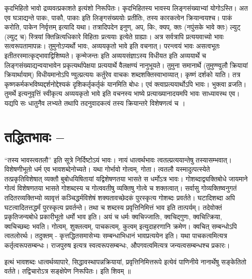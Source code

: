 {कृदभिहितो भावो द्रव्यवत्प्रकाशते इत्यंशो निरूपितः। कृदभिहितस्य भावस्य लिङ्गसंख्याभ्यां योगोऽस्ति। अत एव घञाद्यन्ते पाकः, पाकौ, पाकाः इति लिङ्गसंख्ययोः प्रतीतिः, तस्य कारकत्वेन क्रियान्वयश्च। पाकं करोति, पाकेन निर्वृत्तम् इत्यादि यथा। तत्रादिपदेन इनुण्, अप्, किः, क्यप्, क्तः (नपुंसके भावे क्तः) ल्युट् (ल्युट् च) स्त्रियां क्तिन्नित्यधिकारे विहिताः प्रत्ययाः इत्येते ग्राह्याः। अत्र सर्वत्रापि प्रत्ययवाच्यो भावः सत्वरूपतामापन्नः। तुमुनोऽप्यर्थो भावः, अव्ययकृतो भावे इति वचनात्। परन्त्वयं भावः असत्वभूतः इतीतरस्मात्कृद्भावाद्विशिष्यते। कृन्मेजन्तः इति अव्ययसंज्ञाऽस्य विधीयत इति अव्ययार्थे च लिङ्गसंख्याद्यन्वयाभावेन प्रकृत्यर्थापेक्षया प्रत्ययार्थे वैलक्षण्यं नानुभूयते। तुमुना समानार्थे (तुमुण्ण्वुलौ क्रियायां क्रियार्थायाम्) विधीयमानोऽपि ण्वुल्प्रत्ययः कर्तुरेव वाचकः शब्दशक्तिस्वाभाव्यात्। कृष्णं दर्शको याति। तत्र कृष्णकर्मकभविष्यद्दर्शनोद्देश्यकं दृशिकर्तृकर्तृकं यानमिति बोधः। एवं क्त्वाप्रत्ययार्थोऽपि भावः। भुक्त्वा व्रजति। तुमर्थे इत्यनुवृत्तिं स्वीकृत्य अव्ययकृतो भावे इति वचनस्य भाष्ये प्रत्याख्यानादयमपि भावः साध्यावस्थ एव। यद्यपि सः धातुनैव लभ्यते तथापि तदनुवादकत्वं तस्य क्रियान्तरे विशेषणत्वं च ।

\section*{तद्धितभावः –}

“तस्य भावस्त्वतलौ” इति सूत्रे निर्दिष्टोऽयं भावः। नायं धात्वर्थभावः त्वतल्प्रत्ययान्तेषु तस्यासम्भवात्। विशेषणीभूतो धर्म एव भावशब्देनोच्यते। यथा गोर्भावो गोत्वम्, गोता। त्वतलौ यस्मादुत्पत्स्येते तत्प्रकृतिविशेषात् व्यक्तौ बुबोधयिषितायां यद्विशेषणतया भासते स धर्मोऽत्र भावः। गोशब्दाद्व्यक्तिबोधे जायमाने गोत्वं विशेषणतया भासते गोशब्दस्य च गोत्ववतीषु व्यक्तिषु गोत्वे च शक्तत्वात्। सर्वासु गोव्यक्तिष्वनुगतं तदितरव्यक्तिभ्यो व्यावृत्तं कञ्चिद्धर्मविशेषं शक्यतावच्छेदकं पुरस्कृत्य गोशब्दः प्रवर्तते। घटादिशब्दा अपि घटत्वादितत्तद्धर्मं पुरस्कृत्य प्रवर्तन्ते। तथा च शब्दस्य प्रवृत्तिनिमित्तं भाव इति तात्पर्यम्। तदेवोक्तं प्रकृतिजन्यबोधे प्रकारीभूतो धर्मो भाव इति। अयं च धर्मः क्वचिज्जातिः, क्वचिद्गुणः, क्वचित्क्रिया, क्वचिच्छब्दः भवति। गोत्वम्, शुक्लत्वम्, पाचकत्वम्, कुत्वम् इत्युदाहरणानि क्रमेण। क्वचित् सम्बन्धोऽपि त्वतलोरर्थः। तदुक्तम् - कृत्तद्धितसमासेभ्यः सम्बन्धाभिधानं भावप्रत्ययेन इति। यथा पाचकत्वमित्यत्र कर्तृत्वरूपसम्बन्धः। राजपुरुष इत्यत्र स्वत्वरूपसम्बन्धः, औपगवत्वमित्यत्र जन्यत्वसम्बन्धश्च प्रकारः।

इत्थं भावशब्दः धात्वर्थव्यापारे, सिद्धावस्थापन्नक्रियायां, प्रवृत्तिनिमित्तरूपे इत्येवं पाणिनीये नानार्थेषु सङ्केतितो वर्तते। तद्विचारोऽत्र सङ्क्षेपेण निरूपितः। इति शिवम् ॥

\articleend
}
